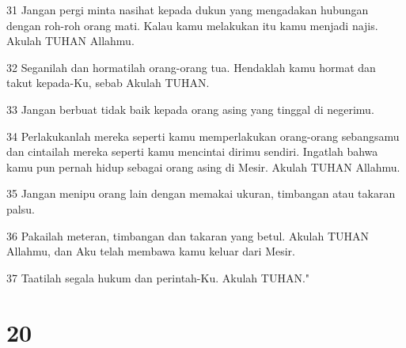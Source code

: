 \par 31 Jangan pergi minta nasihat kepada dukun yang mengadakan hubungan dengan roh-roh orang mati. Kalau kamu melakukan itu kamu menjadi najis. Akulah TUHAN Allahmu.
\par 32 Seganilah dan hormatilah orang-orang tua. Hendaklah kamu hormat dan takut kepada-Ku, sebab Akulah TUHAN.
\par 33 Jangan berbuat tidak baik kepada orang asing yang tinggal di negerimu.
\par 34 Perlakukanlah mereka seperti kamu memperlakukan orang-orang sebangsamu dan cintailah mereka seperti kamu mencintai dirimu sendiri. Ingatlah bahwa kamu pun pernah hidup sebagai orang asing di Mesir. Akulah TUHAN Allahmu.
\par 35 Jangan menipu orang lain dengan memakai ukuran, timbangan atau takaran palsu.
\par 36 Pakailah meteran, timbangan dan takaran yang betul. Akulah TUHAN Allahmu, dan Aku telah membawa kamu keluar dari Mesir.
\par 37 Taatilah segala hukum dan perintah-Ku. Akulah TUHAN."

\chapter{20}

